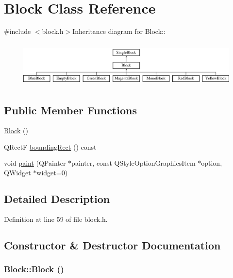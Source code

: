 \hypertarget{class_block}{
\section{Block Class Reference}
\label{class_block}
}


{\ttfamily \#include $<$block.h$>$}Inheritance diagram for Block::\begin{figure}[H]
\begin{center}
\leavevmode
\includegraphics[height=2.4cm]{class_block}
\end{center}
\end{figure}
\subsection*{Public Member Functions}
\begin{DoxyCompactItemize}
\item 
\hyperlink{class_block_a37658a946bf5067ad01d68d9ff086adc}{Block} ()
\item 
QRectF \hyperlink{class_block_aee4444b92a82f5a8080e9019ef1e554d}{boundingRect} () const 
\item 
void \hyperlink{class_block_a36791d086b6fad1a2203bfef6fdbaa0a}{paint} (QPainter $\ast$painter, const QStyleOptionGraphicsItem $\ast$option, QWidget $\ast$widget=0)
\end{DoxyCompactItemize}


\subsection{Detailed Description}


Definition at line 59 of file block.h.

\subsection{Constructor \& Destructor Documentation}
\hypertarget{class_block_a37658a946bf5067ad01d68d9ff086adc}{
\subsubsection[{Block}]{\setlength{\rightskip}{0pt plus 5cm}Block::Block ()}}
\label{class_block_a37658a946bf5067ad01d68d9ff086adc}


